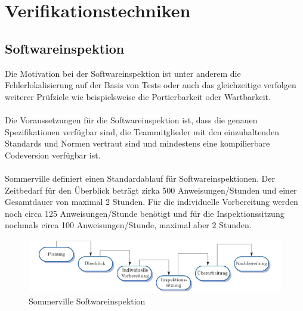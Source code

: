 \section{Verifikationstechniken}
\subsection{Softwareinspektion}
Die Motivation bei der Softwareinspektion ist unter anderem die Fehlerlokalisierung auf der Basis von Tests oder auch das gleichzeitige verfolgen weiterer Prüfziele wie beispielsweise die Portierbarkeit oder Wartbarkeit. 
\\\\
Die Voraussetzungen für die Softwareinspektion ist, dass die genauen Spezifikationen verfügbar sind, die Teammitglieder mit den einzuhaltenden Standards und Normen vertraut sind und mindestens eine kompilierbare Codeversion verfügbar ist. 
\\\\
Sommerville definiert einen Standardablauf für Softwareinspektionen. Der Zeitbedarf für den Überblick beträgt zirka 500 Anweisungen/Stunden und einer Gesamtdauer von maximal 2 Stunden. Für die individuelle Vorbereitung werden noch circa 125 Anweisungen/Stunde benötigt und für die Inspektionssitzung nochmals circa 100 Anweisungen/Stunde, maximal aber 2 Stunden.

\begin{figure}[hbtp]
\centering
\includegraphics[scale=0.8]{document/graphics/SwInspektion} 
\caption{Sommerville Softwareinspektion}
\end{figure}



